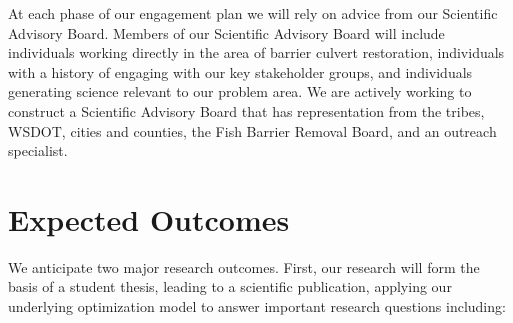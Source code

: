 \documentclass[12pt]{elsarticle}
\begin{document}
At each phase of our engagement plan we will rely on advice from our Scientific Advisory Board. Members of our Scientific Advisory Board will include individuals working directly in the area of barrier culvert restoration, individuals with a history of engaging with our key stakeholder groups, and individuals generating science relevant to our problem area. We are actively working to construct a Scientific Advisory Board that has representation from the tribes, WSDOT, cities and counties, the Fish Barrier Removal Board, and an outreach specialist.





\section{Expected Outcomes} %

We anticipate two major research outcomes. First, our research will form the basis of a student thesis, leading to a scientific publication, applying our underlying optimization model to answer important research questions including:
\end{document}
